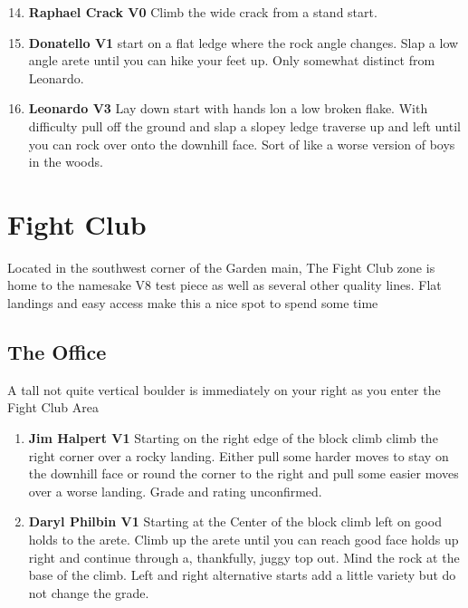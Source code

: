 \begin{multicols*}{2}
				\begin{enumerate}[]
					\setcounter{enumi}{13}
					\item\label{rt:Raphael Crack} \colorbox{green!20}{\textbf{Raphael Crack V0   } }
					\newline Climb the wide crack from a stand start.\
					\setcounter{enumi}{14}
					\item\label{rt:Donatello} \colorbox{green!20}{\textbf{Donatello V1   } }
					\newline start on a flat ledge where the rock angle changes. Slap a low angle arete until you can hike your feet up. Only somewhat distinct from Leonardo.\
					\setcounter{enumi}{15}
					\item\label{rt:Leonardo} \colorbox{green!20}{\textbf{Leonardo V3 \ding{72}  } }
					\newline Lay down start with hands lon a low broken flake. With difficulty pull off the ground and slap a slopey ledge traverse up and left until you can rock over onto the downhill face. Sort of like a worse version of boys in the woods.\
				\end{enumerate}
		\section{Fight Club}\label{sa:Fight Club}
	Located in the southwest corner of the Garden main, The Fight Club zone is home to the namesake V8 test piece as well as several other quality lines. Flat landings and easy access make this a nice spot to spend some time

						\halfPic{./maps/topos/office_c.png}{The Office}

			\subsection*{The Office}\label{bf:The Office}
			A tall not quite vertical boulder is immediately on your right as you enter the Fight Club Area
			
				\begin{enumerate}[]
					\setcounter{enumi}{0}
					\item\label{rt:Jim Halpert} \colorbox{green!20}{\textbf{Jim Halpert V1  \warn \warn } }
					\newline Starting on the right edge of the block climb climb the right corner over a rocky landing. Either pull some harder moves to stay on the downhill face or round the corner to the right and pull some easier moves over a worse landing. Grade and rating unconfirmed.\
					\setcounter{enumi}{1}
					\item\label{rt:Daryl Philbin} \colorbox{green!20}{\textbf{Daryl Philbin V1     \warn } }
					\newline Starting at the Center of the block climb left on good holds to the arete. Climb up the arete until you can reach good face holds up right and continue through a, thankfully, juggy top out. Mind the rock at the base of the climb. Left and right alternative starts add a little variety but do not change the grade.\
				\end{enumerate}

\end{multicols*}
